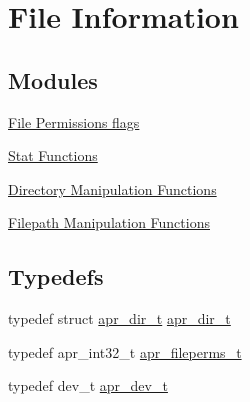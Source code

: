 \hypertarget{group__apr__file__info}{\section{File Information}
\label{group__apr__file__info}
}
\subsection*{Modules}
\begin{DoxyCompactItemize}
\item 
\hyperlink{group__apr__file__permissions}{File Permissions flags}
\item 
\hyperlink{group__apr__file__stat}{Stat Functions}
\item 
\hyperlink{group__apr__dir}{Directory Manipulation Functions}
\item 
\hyperlink{group__apr__filepath}{Filepath Manipulation Functions}
\end{DoxyCompactItemize}
\subsection*{Typedefs}
\begin{DoxyCompactItemize}
\item 
typedef struct \hyperlink{group__apr__file__info_ga92ed8cf52cba2abb42cf74087aa74da8}{apr\-\_\-dir\-\_\-t} \hyperlink{group__apr__file__info_ga92ed8cf52cba2abb42cf74087aa74da8}{apr\-\_\-dir\-\_\-t}
\item 
typedef apr\-\_\-int32\-\_\-t \hyperlink{group__apr__file__info_ga3af19c4c47007169064a70f9351bc7d8}{apr\-\_\-fileperms\-\_\-t}
\item 
typedef dev\-\_\-t \hyperlink{group__apr__file__info_gae2c25c4b679613081599f776efa96c4a}{apr\-\_\-dev\-\_\-t}
\end{DoxyCompactItemize}
